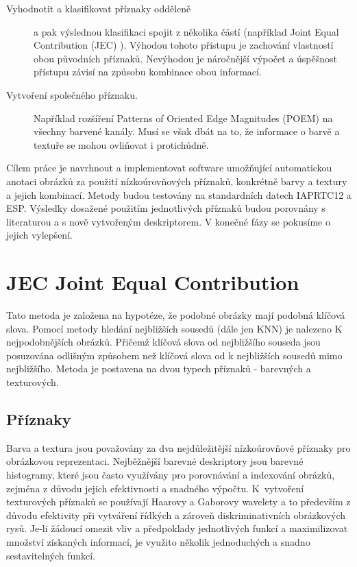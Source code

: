 \documentclass[czech,BP]{thesiskiv}
\begin{document}
\begin{description}
\item[Vyhodnotit a klasifikovat příznaky odděleně] 
a pak výslednou klasifikaci spojit z několika částí (například Joint Equal Contribution (JEC) \cite{JEC} ). Výhodou tohoto přístupu je zachování vlastností obou původních příznaků. Nevýhodou je náročnější výpočet a úspěšnost přístupu závisí na způsobu kombinace obou informací.

\item[Vytvoření společného příznaku.] 
Například rozšíření Patterns of Oriented Edge Magnitudes (POEM) na všechny barvené kanály. Musí se však dbát na to, že informace o barvě a textuře se mohou ovliňovat i protichůdně. 
\end{description} 

\par Cílem práce je navrhnout a implementovat software umožňující automatickou anotaci obrázků za použití nízkoúrovňových příznaků, konkrétně barvy a textury a jejich kombinací. Metody budou testovány na standardních datech IAPRTC12 a ESP. Výsledky dosažené použitím jednotlivých příznaků budou porovnány s literaturou a s nově vytvořeným deskriptorem. V konečné fázy se pokusíme o jejich vylepšení.

\chapter{JEC Joint Equal Contribution}
Tato metoda je založena na hypotéze, že podobné obrázky mají podobná klíčová slova. Pomocí metody hledání nejbližších sousedů (dále jen KNN) je nalezeno K nejpodobnějších obrázků. Přičemž klíčová slova od nejbližšího souseda jsou posuzována odlišným způsobem než klíčová slova od k nejbližších sousedů mimo nejbližšího. Metoda je postavena na dvou typech příznaků - barevných a texturových. 
\cite{JEC}

\section{Příznaky}
\par Barva a textura jsou považovány za dva nejdůležitější nízkoúrovňové příznaky pro obrázkovou reprezentaci. Nejběžnější barevné deskriptory jsou barevné histogramy, které jsou často využívány pro porovnávání a indexování obrázků, zejména z důvodu jejich efektivnosti a snadného výpočtu. K~vytvoření texturových příznaků se používají Haarovy a Gaborovy wavelety a to především z důvodu efektivity při vytváření řídkých a zároveň diskriminativních obrázkových rysů. Je-li žádoucí omezit vliv a předpoklady jednotlivých funkcí a maximilizovat množství získaných informací, je využito několik jednoduchých a snadno sestavitelných funkcí. \cite{JEC}
\end{document}
